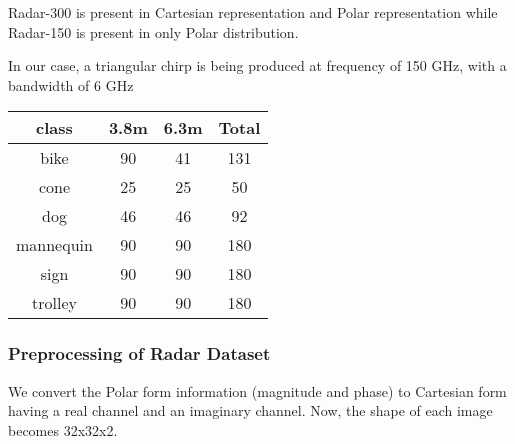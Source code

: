  Radar-300 is present in Cartesian representation and Polar representation while Radar-150 is present in only Polar distribution. 
 
 
 
 In our case, a triangular chirp is being produced at frequency of 150 GHz, with a bandwidth of 6 GHz
 
 \begin{table}
 \begin{center}
 	\begin{tabular}{ c|c|c|c } 
 		\textbf{class} & \textbf{3.8m} & \textbf{6.3m} & \textbf{Total}\\
 		\hline 
 		bike & 90 & 41&131\\
 		\hline
 		cone & 25 & 25 & 50\\
 		\hline 
 		dog & 46 & 46&92\\
 		\hline 
		mannequin & 90 & 90&180\\
 		\hline 
 		sign & 90 & 90&180\\
 		\hline 
 		trolley & 90 & 90&180\\
 		
 	\end{tabular}
 	
 \end{center}
\label{table:datadist}
 \end{table}
 

 
 \subsubsection{Preprocessing of Radar Dataset}
 We convert the Polar form information (magnitude and phase) to Cartesian form having a real channel and an imaginary channel. Now, the shape of each image becomes 32x32x2.
  
